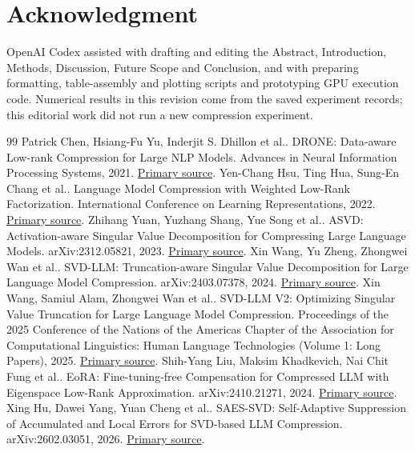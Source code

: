 \documentclass[conference]{IEEEtran}
\begin{document}
\section*{Acknowledgment}
OpenAI Codex \cite{openaicodex2026} assisted with drafting and editing the Abstract, Introduction, Methods, Discussion, Future Scope and Conclusion, and with preparing formatting, table-assembly and plotting scripts and prototyping GPU execution code. Numerical results in this revision come from the saved experiment records; this editorial work did not run a new compression experiment.\par\smallskip
\begin{thebibliography}{99}
 Patrick Chen, Hsiang-Fu Yu, Inderjit S. Dhillon et al.. DRONE: Data-aware Low-rank Compression for Large NLP Models. Advances in Neural Information Processing Systems, 2021. \href{https://proceedings.neurips.cc/paper/2021/hash/f56de5ef149cf0aedcc8f4797031e229-Abstract.html}{Primary source}.
 Yen-Chang Hsu, Ting Hua, Sung-En Chang et al.. Language Model Compression with Weighted Low-Rank Factorization. International Conference on Learning Representations, 2022. \href{https://openreview.net/pdf?id=uPv9Y3gmAI5}{Primary source}.
 Zhihang Yuan, Yuzhang Shang, Yue Song et al.. ASVD: Activation-aware Singular Value Decomposition for Compressing Large Language Models. arXiv:2312.05821, 2023. \href{https://arxiv.org/abs/2312.05821}{Primary source}.
 Xin Wang, Yu Zheng, Zhongwei Wan et al.. SVD-LLM: Truncation-aware Singular Value Decomposition for Large Language Model Compression. arXiv:2403.07378, 2024. \href{https://arxiv.org/abs/2403.07378}{Primary source}.
 Xin Wang, Samiul Alam, Zhongwei Wan et al.. SVD-LLM V2: Optimizing Singular Value Truncation for Large Language Model Compression. Proceedings of the 2025 Conference of the Nations of the Americas Chapter of the Association for Computational Linguistics: Human Language Technologies (Volume 1: Long Papers), 2025. \href{https://aclanthology.org/2025.naacl-long.217/}{Primary source}.
 Shih-Yang Liu, Maksim Khadkevich, Nai Chit Fung et al.. EoRA: Fine-tuning-free Compensation for Compressed LLM with Eigenspace Low-Rank Approximation. arXiv:2410.21271, 2024. \href{https://arxiv.org/abs/2410.21271}{Primary source}.
 Xing Hu, Dawei Yang, Yuan Cheng et al.. SAES-SVD: Self-Adaptive Suppression of Accumulated and Local Errors for SVD-based LLM Compression. arXiv:2602.03051, 2026. \href{https://arxiv.org/abs/2602.03051}{Primary source}.

\end{thebibliography}
\end{document}
